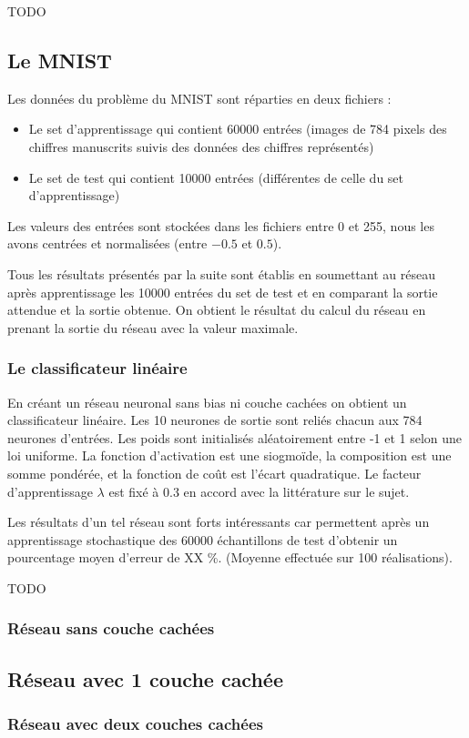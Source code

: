 TODO

\subsection{Le MNIST}

Les données du problème du MNIST sont réparties en deux fichiers :
\begin{itemize}
    \item Le set d'apprentissage qui contient 60000 entrées (images de 784 pixels
          des chiffres manuscrits suivis des données des chiffres représentés)
    \item Le set de test qui contient 10000 entrées (différentes de celle du set
          d'apprentissage)
\end{itemize}

\medskip

Les valeurs des entrées sont stockées dans les fichiers entre 0 et 255, nous
les avons centrées et normalisées (entre $-0.5$ et $0.5$).

\medskip

Tous les résultats présentés par la suite sont établis en soumettant au réseau
après apprentissage les 10000 entrées du set de test et en comparant la sortie
attendue et la sortie obtenue. On obtient le résultat du calcul du réseau en
prenant la sortie du réseau avec la valeur maximale.

\subsubsection{Le classificateur linéaire}

En créant un réseau neuronal sans bias ni couche cachées on obtient un
classificateur linéaire. Les 10 neurones de sortie sont reliés chacun aux 784
neurones d'entrées. Les poids sont initialisés aléatoirement entre -1 et 1 selon
 une loi uniforme. La fonction d'activation est une siogmoïde, la composition
est une somme pondérée, et la fonction de coût est l'écart quadratique. Le
facteur d'apprentissage $\lambda$ est fixé à $0.3$ en accord avec la littérature
 sur le sujet.


\medskip

Les résultats d'un tel réseau sont forts intéressants car permettent après un
apprentissage stochastique des 60000 échantillons de test d'obtenir un
pourcentage moyen d'erreur de XX \%. (Moyenne effectuée sur 100 réalisations).

TODO

\subsubsection{Réseau sans couche cachées}

\subsection{Réseau avec 1 couche cachée}

\subsubsection{Réseau avec deux couches cachées}
